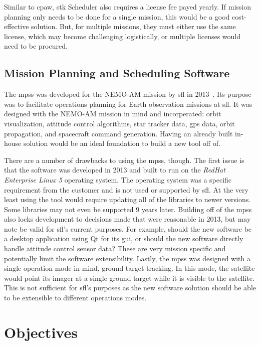 Similar to \gls{cpaw}, \gls{stk} Scheduler also requires a license fee payed
yearly. If mission planning only needs to be done for a single mission, this
would be a good cost-effective solution. But, for multiple missions, they must
either use the same license, which may become challenging logistically, or
multiple licenses would need to be procured.


\subsection{Mission Planning and Scheduling Software}

The \gls{mpss} was developed for the NEMO-AM mission by \gls{sfl} in
2013~\cite{mehradnia_design_2013}.  Its purpose was to facilitate operations
planning for Earth observation missions at \gls{sfl}. It was designed with the
NEMO-AM mission in mind and incorperated: orbit visualization, attitude control
algorithms, star tracker data, \gls{gps} data, orbit propagation, and
spacecraft command generation.  Having an already built in-house solution would
be an ideal foundation to build a new tool off of. 

There are a number of drawbacks to using the \gls{mpss}, though. The first
issue is that the software was developed in 2013 and built to run on the
\textit{RedHat Enterprise Linux 5} operating system. The operating system was a
specific requirement from the customer and is not used or supported by
\gls{sfl}. At the very least using the tool would require updating all of the
libraries to newer versions. Some libraries may not even be supported 9 years
later. Building off of the \gls{mpss} also locks development to decisions made
that were reasonable in 2013, but may note be valid for \gls{sfl}'s current
purposes.  For example, should the new software be a desktop application using
Qt for its \gls{gui}, or should the new software directly handle attitude
control sensor data? These are very mission specific and potentially limit the
software extensibility. Lastly, the \gls{mpss} was designed with a single
operation mode in mind, ground target tracking. In this mode, the satellite
would point its imager at a single ground target while it is visible to the
satellite. This is not sufficient for \gls{sfl}'s purposes as the new software
solution should be able to be extensible to different operations modes.    


\section{Objectives}

